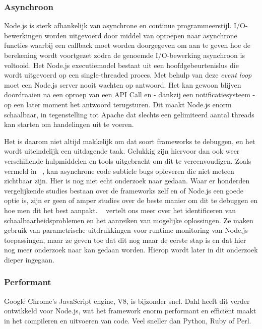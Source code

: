 \subsubsection{Asynchroon}
\label{sec:async}

Node.js is sterk afhankelijk van asynchrone en continue programmeerstijl. I/O-bewerkingen worden uitgevoerd door middel van oproepen naar asynchrone functies waarbij een callback moet worden doorgegeven om aan te geven hoe de berekening wordt voortgezet zodra de genoemde I/O-bewerking asynchroon is voltooid. Het Node.js executiemodel bestaat uit een hoofdgebeurtenislus die wordt uitgevoerd op een single-threaded proces. Met behulp van deze \textit{event loop} moet een Node.js server nooit wachten op antwoord. Het kan gewoon blijven doordraaien na een oproep van een API Call en - dankzij een notificatiesysteem - op een later moment het antwoord terugsturen. Dit maakt Node.js enorm schaalbaar, in tegenstelling tot Apache dat slechts een gelimiteerd aantal threads kan starten om handelingen uit te voeren.

Het is daarom niet altijd makkelijk om dat soort frameworks te debuggen, en het wordt uiteindelijk een uitdagende taak. Gelukkig zijn hiervoor dan ook weer verschillende hulpmiddelen en tools uitgebracht om dit te vereenvoudigen. Zoals vermeld in ~\autocite{Runtime2017}, kan asynchrone code subtiele bugs opleveren die niet meteen zichtbaar zijn. Hier is nog niet echt onderzoek naar gedaan. Waar er honderden vergelijkende studies bestaan over de frameworks zelf en of Node.js een goede optie is, zijn er geen of amper studies over de beste manier om dit te debuggen en hoe men dit het best aanpakt. ~\autocite{Runtime2017} vertelt ons meer over het identificeren van schaalbaarheidsproblemen en het aanreiken van mogelijke oplossingen. Ze maken gebruik van parametrische uitdrukkingen voor runtime monitoring van Node.js toepassingen, maar ze geven toe dat dit nog maar de eerste stap is en dat hier nog meer onderzoek naar kan gedaan worden. Hierop wordt later in dit onderzoek dieper ingegaan.

\subsubsection{Performant}
\label{sec:fast}

Google Chrome's JavaScript engine, V8, is bijzonder snel. Dahl heeft dit verder ontwikkeld voor Node.js, wat het framework enorm performant en efficiënt maakt in het compileren en uitvoeren van code. Veel sneller dan Python, Ruby of Perl.

